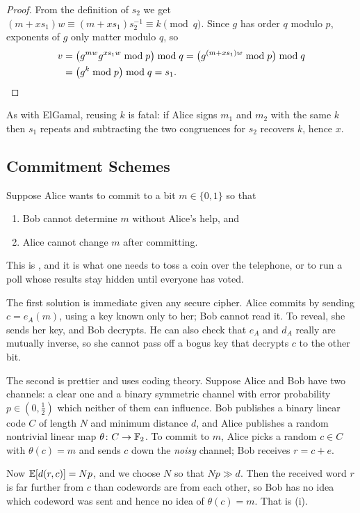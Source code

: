 \documentclass[a4paper]{scrartcl}
\begin{document}
\begin{proof}
	From the definition of $s_2$ we get $(m+xs_1)w \equiv (m+xs_1)s_2^{-1}\equiv k \pmod q$. Since $g$ has order $q$ modulo $p$, exponents of $g$ only matter modulo $q$, so
	\begin{align*}
		v &= \bigl(g^{mw}g^{xs_1w}\bmod p\bigr)\bmod q = \bigl(g^{(m+xs_1)w}\bmod p\bigr)\bmod q\\
		&= \bigl(g^k\bmod p\bigr)\bmod q = s_1. \qedhere
	\end{align*}
\end{proof}

As with ElGamal, reusing $k$ is fatal: if Alice signs $m_1$ and $m_2$ with the same $k$ then $s_1$ repeats and subtracting the two congruences for $s_2$ recovers $k$, hence $x$.

\subsection{Commitment Schemes}

Suppose Alice wants to commit to a bit $m \in\{0,1\}$ so that
\begin{enumerate}[label=(\roman*)]
	\item Bob cannot determine $m$ without Alice's help, and
	\item Alice cannot change $m$ after committing.
\end{enumerate}
This is , and it is what one needs to toss a coin over the telephone, or to run a poll whose results stay hidden until everyone has voted.

The first solution is immediate given any secure cipher. Alice commits by sending $c = e_A(m)$, using a key known only to her; Bob cannot read it. To reveal, she sends her key, and Bob decrypts. He can also check that $e_A$ and $d_A$ really are mutually inverse, so she cannot pass off a bogus key that decrypts $c$ to the other bit.

The second is prettier and uses coding theory. Suppose Alice and Bob have two channels: a clear one and a binary symmetric channel with error probability $p \in (0,\tfrac12)$ which neither of them can influence. Bob publishes a binary linear code $C$ of length $N$ and minimum distance $d$, and Alice publishes a random nontrivial linear map $\theta\colon C\to\mathbb{F}_2$. To commit to $m$, Alice picks a random $c \in C$ with $\theta(c)=m$ and sends $c$ down the \emph{noisy} channel; Bob receives $r = c+e$.

Now $\mathbb{E}[d(r,c)] = Np$, and we choose $N$ so that $Np \gg d$. Then the received word $r$ is far further from $c$ than codewords are from each other, so Bob has no idea which codeword was sent and hence no idea of $\theta(c) = m$. That is (i).
\end{document}
